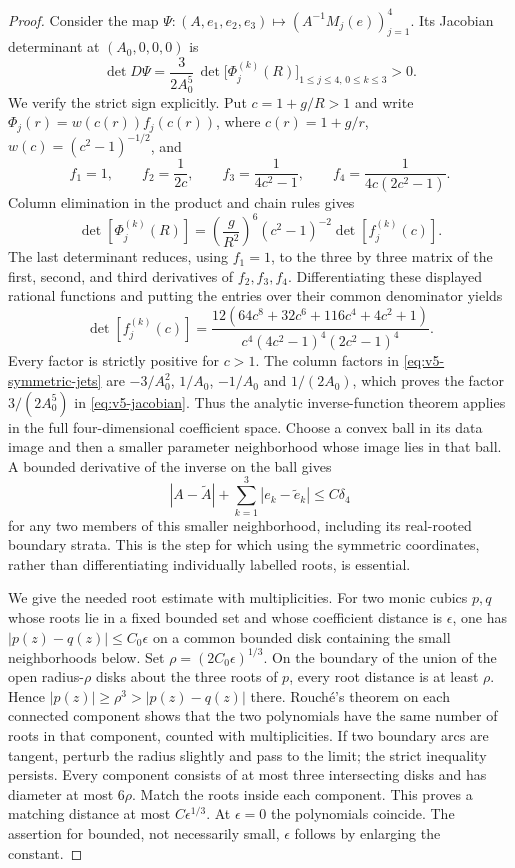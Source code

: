 \begin{proof}
Consider the map
$\Psi:(A,e_1,e_2,e_3)\mapsto(A^{-1}M_j(e))_{j=1}^4$.
Its Jacobian determinant at $(A_0,0,0,0)$ is
\begin{equation}\label{eq:v5-jacobian}
 \det D\Psi=\frac3{2A_0^5}\,
   \det\bigl[\Phi_j^{(k)}(R)\bigr]_{1\le j\le4,\,0\le k\le3}>0.
\end{equation}
We verify the strict sign explicitly. Put $c=1+g/R>1$ and write
$\Phi_j(r)=w(c(r))f_j(c(r))$, where $c(r)=1+g/r$,
$w(c)=(c^2-1)^{-1/2}$, and
\[
 f_1=1,\qquad f_2=\frac1{2c},\qquad
 f_3=\frac1{4c^2-1},\qquad f_4=\frac1{4c(2c^2-1)}.
\]
Column elimination in the product and chain rules gives
\[
 \det[\Phi_j^{(k)}(R)]
  =\left(\frac g{R^2}\right)^6(c^2-1)^{-2}
        \det[f_j^{(k)}(c)].
\]
The last determinant reduces, using $f_1=1$, to the three by three
matrix of the first, second, and third derivatives of $f_2,f_3,f_4$.
Differentiating these displayed rational functions and putting the
entries over their common denominator yields
\begin{equation}\label{eq:v5-wronskian}
 \det[f_j^{(k)}(c)]
 =\frac{12(64c^8+32c^6+116c^4+4c^2+1)}
 {c^4(4c^2-1)^4(2c^2-1)^4}.
\end{equation}
Every factor is strictly positive for $c>1$. The column factors in
\eqref{eq:v5-symmetric-jets} are $-3/A_0^2$, $1/A_0$, $-1/A_0$ and $1/(2A_0)$,
which proves the factor $3/(2A_0^5)$ in \eqref{eq:v5-jacobian}.
Thus the analytic inverse-function theorem applies in the full
four-dimensional coefficient space. Choose a convex ball in its data
image and then a smaller parameter neighborhood whose image lies in
that ball. A bounded derivative of the inverse on the ball gives
\begin{equation}\label{eq:v5-coefficient-stability}
 |A-\widetilde A|+\sum_{k=1}^3|e_k-\widetilde e_k|
                           \le C\delta_4
\end{equation}
for any two members of this smaller neighborhood, including its
real-rooted boundary strata. This is the step for which using the
symmetric coordinates, rather than differentiating individually
labelled roots, is essential.

We give the needed root estimate with multiplicities. For two monic
cubics $p,q$ whose roots lie in a fixed bounded set and whose coefficient
distance is $\epsilon$, one has $|p(z)-q(z)|\le C_0\epsilon$ on a common
bounded disk containing the small neighborhoods below. Set
$\rho=(2C_0\epsilon)^{1/3}$. On the boundary of the union of the open
radius-$\rho$ disks about the three roots of $p$, every root distance
is at least $\rho$. Hence $|p(z)|\ge\rho^3>|p(z)-q(z)|$ there.
Rouch\'e's theorem on each connected component shows that the two
polynomials have the same number of roots in that component, counted
with multiplicities. If two boundary arcs are tangent, perturb the
radius slightly and pass to the limit; the strict inequality persists.
Every component consists of at most three intersecting disks and has
diameter at most $6\rho$. Match the roots inside each component. This
proves a matching distance at most $C\epsilon^{1/3}$. At $\epsilon=0$
the polynomials coincide. The assertion for bounded, not necessarily
small, $\epsilon$ follows by enlarging the constant.


\end{proof}
